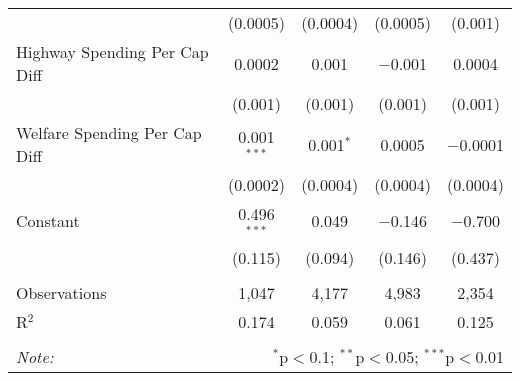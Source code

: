 \begin{table}[!htbp]
\begin{tabular}{@{\extracolsep{5pt}}lcccc}
  & (0.0005) & (0.0004) & (0.0005) & (0.001) \\ 
  Highway Spending Per Cap Diff & 0.0002 & 0.001 & $-$0.001 & 0.0004 \\ 
  & (0.001) & (0.001) & (0.001) & (0.001) \\ 
  Welfare Spending Per Cap Diff & 0.001$^{***}$ & 0.001$^{*}$ & 0.0005 & $-$0.0001 \\ 
  & (0.0002) & (0.0004) & (0.0004) & (0.0004) \\ 
  Constant & 0.496$^{***}$ & 0.049 & $-$0.146 & $-$0.700 \\ 
  & (0.115) & (0.094) & (0.146) & (0.437) \\ 
 \hline \\[-1.8ex] 
Observations & 1,047 & 4,177 & 4,983 & 2,354 \\ 
R$^{2}$ & 0.174 & 0.059 & 0.061 & 0.125 \\ 
\hline 
\hline \\[-1.8ex] 
\textit{Note:}  & \multicolumn{4}{r}{$^{*}$p$<$0.1; $^{**}$p$<$0.05; $^{***}$p$<$0.01} \\ 
\end{tabular} 
\end{table} 
